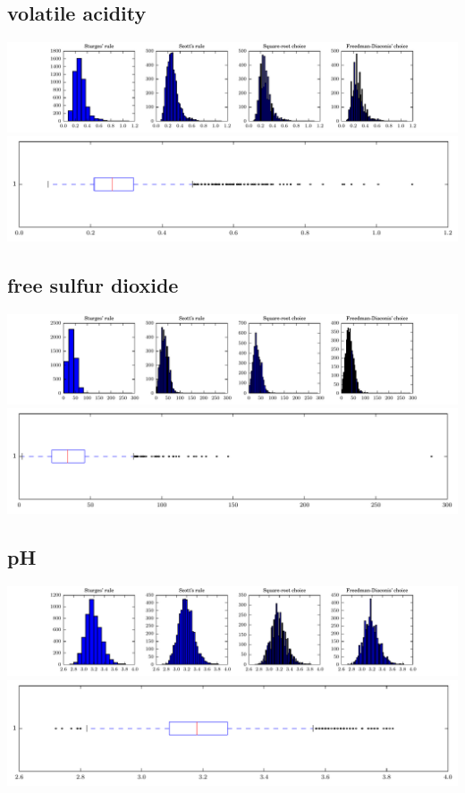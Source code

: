 \documentclass{report}
\begin{document}
\subsection{volatile acidity}
\includegraphics{histograms/volatile_acidity.pdf}
\includegraphics{boxplots/volatile_acidity.pdf}
\subsection{free sulfur dioxide}
\includegraphics{histograms/free_sulfur_dioxide.pdf}
\includegraphics{boxplots/free_sulfur_dioxide.pdf}
\subsection{pH}
\includegraphics{histograms/pH.pdf}
\includegraphics{boxplots/pH.pdf}
\end{document}
